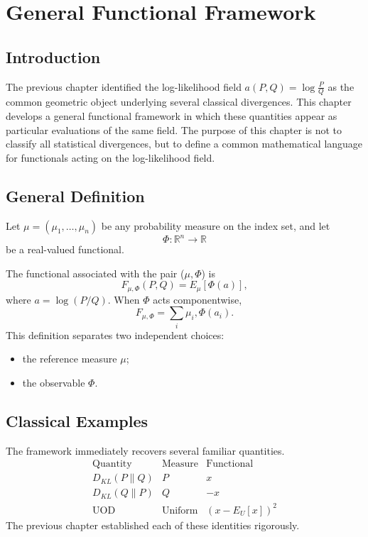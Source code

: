 \chapter[General Functional Framework]{General Functional Framework}
\section{Introduction}
The previous chapter identified the log-likelihood field
$a(P,Q)=\log\frac{P}{Q}$
as the common geometric object underlying several classical divergences.
This chapter develops a general functional framework in which these
quantities appear as particular evaluations of the same field.
The purpose of this chapter is not to classify all statistical
divergences, but to define a common mathematical language for
functionals acting on the log-likelihood field.
\section{General Definition}
Let $\mu=(\mu_{1},\ldots,\mu_{n})$ be any probability measure on the index set, and let
\[ \Phi:\mathbb{R}^{n}\rightarrow\mathbb{R}
\]
be a real-valued functional.
\begin{definition}
\label{ch:def:28-1}
The functional associated with the pair (\(\mu,\Phi\)) is
\[ \boxed{
F_{\mu,\Phi}(P,Q)
=
E_\mu[\Phi(a)],
} \]
where
$a=\log(P/Q).$
When \(\Phi\) acts componentwise,
\[ F_{\mu,\Phi} = \sum_{i}
\mu_{i},\Phi(a_i). \]
This definition separates two independent choices:
\begin{itemize}
  \item the reference measure \(\mu\);
  \item the observable \(\Phi\).
\end{itemize}
\end{definition}
\section{Classical Examples}
The framework immediately recovers several familiar quantities.
\[
\begin{array}{lll}
\text{Quantity} & \text{Measure} & \text{Functional} \\
\hline
D_{KL}(P\|Q) & P & x \\
D_{KL}(Q\|P) & Q & -x \\
\text{UOD} & \text{Uniform} & (x-E_U[x])^2
\end{array}
\]
The previous chapter established each of these identities rigorously.

